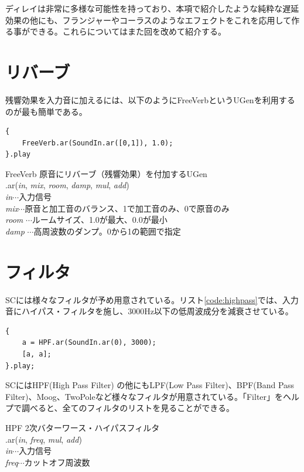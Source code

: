 \documentclass{jsarticle}
\begin{document}
ディレイは非常に多様な可能性を持っており、本項で紹介したような純粋な遅延効果の他にも、フランジャーやコーラスのようなエフェクトをこれを応用して作る事ができる。これらについてはまた回を改めて紹介する。

\section{リバーブ}
残響効果を入力音に加えるには、以下のようにFreeVerbというUGenを利用するのが最も簡単である。

\begin{lstlisting}[caption=リバーブ, label=code:reverb]
{
	FreeVerb.ar(SoundIn.ar([0,1]), 1.0);
}.play
\end{lstlisting}

\begin{itembox}[l]{FreeVerb}
{\footnotesize 
原音にリバーブ（残響効果）を付加するUGen\\
.ar({\it in}, {\it mix}, {\it room}, {\it damp}, {\it mul}, {\it add})\\
{\it in}$\cdots$入力信号\\
{\it mix}$\cdots$原音と加工音のバランス、1で加工音のみ、0で原音のみ\\
{\it room} $\cdots$ルームサイズ、1.0が最大、0.0が最小\\
{\it damp} $\cdots$高周波数のダンプ。0から1の範囲で指定\\
}
\end{itembox}

\section{フィルタ}
SCには様々なフィルタが予め用意されている。リスト\ref{code:highpass}では、入力音にハイパス・フィルタを施し、3000Hz以下の低周波成分を減衰させている。

\begin{lstlisting}[caption=ハイパス・フィルタ, label=code:highpass]
{
	a = HPF.ar(SoundIn.ar(0), 3000);
	[a, a];
}.play;
\end{lstlisting}

SCにはHPF(High Pass Filter) の他にもLPF(Low Pass Filter)、BPF(Band Pass Filter)、Moog、TwoPoleなど様々なフィルタが用意されている。「Filter」をヘルプで調べると、全てのフィルタのリストを見ることができる。

\begin{itembox}[l]{HPF}
{\footnotesize 
2次バターワース・ハイパスフィルタ\\
.ar({\it in}, {\it freq}, {\it mul}, {\it add})\\

{\it in}$\cdots$入力信号\\
{\it freq}$\cdots$カットオフ周波数\\
}
\end{itembox}
\end{document}
